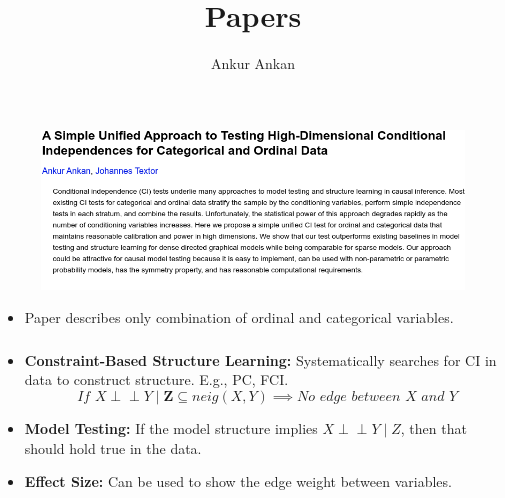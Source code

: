 \documentclass{beamer}
\def\ci{\perp\!\!\!\!\!\perp}
\begin{document}
\title[]{Papers}
\author [] {Ankur Ankan}
\date{}

\begin{frame}
	\frametitle{}
	\begin{figure}
		\centering
		\includegraphics[scale=0.4]{imgs/ankan_textor}
		\caption*{}
	\end{figure}
	\vspace{-2em}
	\begin{itemize}
		\item Paper describes only combination of ordinal and categorical variables.	
	\end{itemize}
\end{frame}

\begin{frame}
	\frametitle{}
	\begin{itemize}
		\item \textbf{Constraint-Based Structure Learning:} Systematically searches for CI in data to construct structure. E.g., PC, FCI.
			$$ \textit{ If } X \ci Y \mid \bm{Z} \subseteq \textit{neig}(X, Y)  \implies \textit{No edge between X and Y} $$
		\item \textbf{Model Testing:} If the model structure implies $ X \ci Y \mid Z $, then that should hold true in the data.
		\item \textbf{Effect Size:} Can be used to show the edge weight between variables.
	\end{itemize}
\end{frame}
\end{document}
